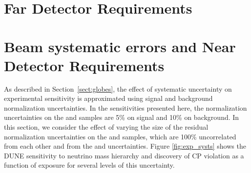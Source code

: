 \section{Far Detector Requirements}
\label{sec:physics-lbnosc-fd-req}

\section{Beam systematic errors and Near Detector Requirements}
\label{sec:physics-lbnosc-beamnd-req}

As described in Section~\ref{sect:globes}, the effect of systematic uncertainty on
experimental sensitivity is approximated using signal and background
normalization uncertainties. In the sensitivities presented here, the
normalization uncertainties on the \numu and \anumu samples are 5\%
on signal and 10\% on background. In this section, we consider the effect of
varying the size of the residual normalization uncertainties
on the \nue and \anue samples, which are 100\% uncorrelated from each other and from the
\numu and \anumu uncertainties.
Figure \ref{fig:exp_systs} shows the
DUNE sensitivity to neutrino mass hierarchy and discovery of CP violation
as a function of exposure for several levels of this uncertainty.


